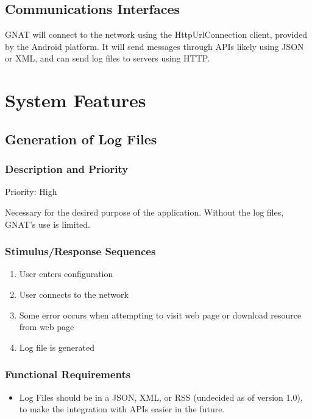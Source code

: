 \documentclass{scrreprt}
\def\version{1.0}
\begin{document}
\section{Communications Interfaces}

GNAT will connect to the network using the HttpUrlConnection client, provided by the Android platform. It will send messages through APIs likely using JSON or XML, and can send log files to servers using HTTP\@.

\chapter{System Features}

\section{Generation of Log Files}

\subsection{Description and Priority}

Priority: High

Necessary for the desired purpose of the application.  Without the log files, GNAT's use is limited.

\subsection{Stimulus/Response Sequences}
\begin{enumerate}
\item User enters configuration
\item User connects to the network
\item Some error occurs when attempting to visit web page or download resource from web page
\item Log file is generated
\end{enumerate}

\subsection{Functional Requirements}

\begin{itemize}
\item Log Files should be in a JSON, XML, or RSS (undecided as of version \version), to make the integration with APIs easier in the future.
\end{itemize}
\end{document}
